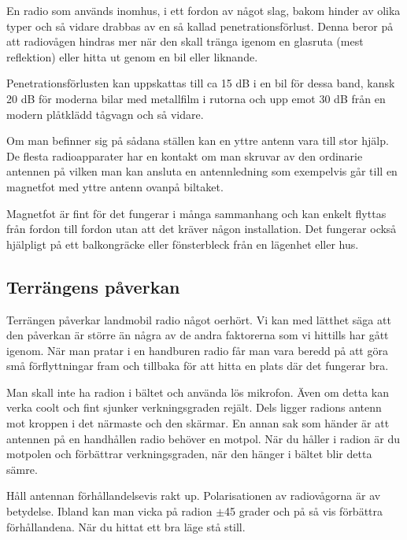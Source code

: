 \documentclass[12ypt,swedish,a4paper]{report}
\begin{document}
En radio som används inomhus, i ett fordon av något slag, bakom hinder av olika typer och så vidare drabbas av en så kallad penetrationsförlust. Denna beror på att radiovågen hindras mer när den skall tränga igenom en glasruta (mest reflektion) eller hitta ut genom en bil eller liknande. 

Penetrationsförlusten kan uppskattas till ca 15 dB i en bil för dessa band, kansk 20 dB för moderna bilar med metallfilm i rutorna och upp emot 30 dB från en modern plåtklädd tågvagn och så vidare.

Om man befinner sig på sådana ställen kan en yttre antenn vara till stor hjälp. De flesta radioapparater har en kontakt om man skruvar av den ordinarie antennen på vilken man kan ansluta en antennledning som exempelvis går till en magnetfot med yttre antenn ovanpå biltaket.

Magnetfot är fint för det fungerar i många sammanhang och kan enkelt flyttas från fordon till fordon utan att det kräver någon installation. Det fungerar också hjälpligt på ett balkongräcke eller fönsterbleck från en lägenhet eller hus.


\subsection{Terrängens påverkan}

Terrängen påverkar landmobil radio något oerhört. Vi kan med lätthet säga att den påverkan är större än några av de andra faktorerna som vi hittills har gått igenom. När man pratar i en handburen radio får man vara beredd på att göra små förflyttningar fram och tillbaka för att hitta en plats där det fungerar bra.

Man skall inte ha radion i bältet och använda lös mikrofon. Även om detta kan verka coolt och fint sjunker verkningsgraden rejält. Dels ligger radions antenn mot kroppen i det närmaste och den skärmar. En annan sak som händer är att antennen på en handhållen radio behöver en motpol. När du håller i radion är du motpolen och förbättrar verkningsgraden, när den hänger i bältet blir detta sämre.

Håll antennan förhållandelsevis rakt up. Polarisationen av radiovågorna är av betydelse. Ibland kan man vicka på radion $\pm$45 grader och på så vis förbättra förhållandena. När du hittat ett bra läge stå still.

\end{document}

